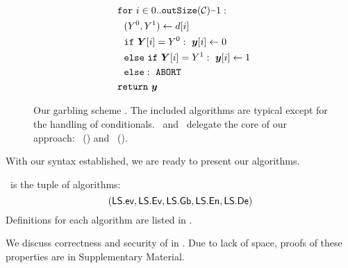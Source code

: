 \begin{figure}
\begin{adjustwidth}{-0.1\textwidth}{-0.1\textwidth}
\begin{minipage}[t]{0.40\linewidth}
\begin{align*}
      &~~\cfor~i \in 0.. \outsize(\cir)\minus 1:\\
      &~~~~(Y^0, Y^1) \gets d[i]\\
      &~~~~\cif~\gcirout[i] = Y^0:~\cirout[i] \gets 0\\
      &~~~~\celse~\cif~\gcirout[i] = Y^1:~\cirout[i] \gets 1\\
      &~~~~\celse:~\mathtt{ABORT}\\
      &~~\creturn~\cirout
    \end{align*}
  \end{minipage}
  \end{adjustwidth}
  \caption{%
    Our garbling scheme \ourschemelong.
    The included algorithms are typical except for the handling of
    conditionals.
    \gEv\ and \gGb\ delegate the core of our approach: \evcond\
    () and
    \gbcond\ ().
  }\label{fig:scheme}
\end{figure}


With our syntax established, we are ready to present our algorithms.
\begin{construction}[\ourschemelong]\label{ourconstr}
  \ourschemelong\ is the tuple of algorithms:
  \[ (\textsf{LS}.\textsf{ev}, \textsf{LS}.\textsf{Ev}, \textsf{LS}.\textsf{Gb}, \textsf{LS}.\textsf{En}, \textsf{LS}.\textsf{De}) \]
  Definitions for each algorithm are listed in \Cref{fig:scheme}.
\end{construction}

We discuss correctness and security of  in
. Due to lack of space, proofs of these properties are
in Supplementary Material.

